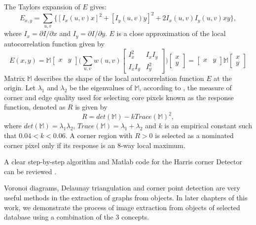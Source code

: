 \documentclass[10pt,a4paper]{article}
\begin{document}
      The Taylors expansion of $E$ gives:
      \begin{equation}
      E_{x,y} = \sum_{u,v} \{[I_x (u,v)x]^2 + [I_y(u,v)y]^2 + 2I_x(u,v)I_y (u,v)xy\},
      \end{equation}  
      where $I_x = \partial I / \partial x$ and $I_y = \partial I /\partial y$. $E$ is a close approximation of the local autocorrelation function given by
      \begin{equation}
      E(x,y) = \mathbb{M}\begin{bmatrix}
      x & y
      \end{bmatrix} \Bigg(\sum_{u,v} w(u,v)  
       \begin{bmatrix}
       I_x ^2 & I_x I_y  \\
       I_xI_y & I_y ^2
       \end{bmatrix}  \Bigg)\begin{bmatrix}
      x \\
      y
      \end{bmatrix}  = \begin{bmatrix}
      x & y
      \end{bmatrix} \mathbb{M}\begin{bmatrix}
      x \\
      y
      \end{bmatrix}
      \end{equation}
      Matrix $\mathbb{M}$ describes the shape of the local autocorrelation function $E$ at the origin.
      Let $\lambda_1$ and $\lambda_2$ be the eigenvalues of $\mathbb{M}$, according to \citep{harris1988combined}, the measure of corner and edge quality used for selecting core pixels known as the response function, denoted as $R$ is given by
      \begin{equation}
      R = det(\mathbb{M}) - kTrace(\mathbb{M})^2,
      \end{equation}       
      where $det(\mathbb{M})=\lambda_1 \lambda_2$, $Trace(\mathbb{M}) = \lambda_1+ \lambda_2$ and $k$ is an empirical constant such that $0.04 <k < 0.06$.
      A corner region with $R>0$ is selected as a nominated corner pixel only if its response is an $8$-way local maximum.
      
      A clear step-by-step algorithm and Matlab code for the Harris corner Detector can be reviewed \citep{stoica2011delaunay}.
      
     Voronoi diagrams, Delaunay triangulation and corner point detection are very useful methods in the extraction of graphs from objects. In later chapters of this work, we demonstrate the process of image extraction from objects of selected database using a combination of the $3$ concepts.
     
\end{document}
